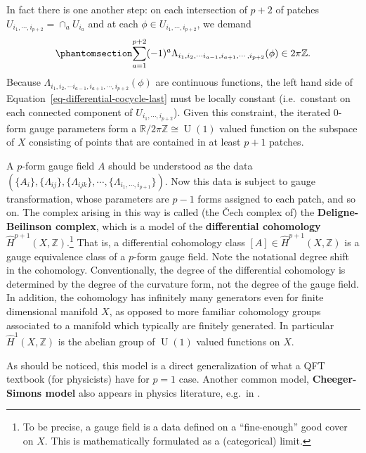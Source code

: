 \documentclass[
  letterpaper,
  DIV=11,
  numbers=noendperiod]{scrreport}
\DeclareMathOperator{\U}{U}
\begin{document}
In fact there is one another step: on each intersection of \(p+2\) of
patches \(U_{i_1,\cdots,i_{p+2}} = \cap_a U_{i_a}\) and at each
\(\phi\in U_{i_1,\cdots,i_{p+2}}\), we demand
\begin{equation}\phantomsection\label{eq-differential-cocycle-last}{ \sum_{a=1}^{p+2} (-1)^a \Lambda_{i_{1},i_2,\cdots i_{a-1},i_{a+1},\cdots,i_{p+2}}(\phi) \in 2\pi\mathbb{Z}.
}\end{equation} Because
\(\Lambda_{i_{1},i_2,\cdots i_{a-1},i_{a+1},\cdots,i_{p+2}}(\phi)\) are
continuous functions, the left hand side of
Equation~\ref{eq-differential-cocycle-last} must be locally constant
(i.e.~constant on each connected component of
\(U_{i_1,\cdots,i_{p+2}}\)). Given this constraint, the iterated 0-form
gauge parameters form a \(\mathbb{R}/2\pi\mathbb{Z}\cong\U(1)\) valued
function on the subspace of \(X\) consisting of points that are
contained in at least \(p+1\) patches.

A \(p\)-form gauge field \(A\) should be understood as the data
\((\{A_i\},\{\Lambda_{ij}\},\{\Lambda_{ijk}\},\cdots,\{\Lambda_{i_1,\cdots,i_{p+1}}\})\).
Now this data is subject to gauge transformation, whose parameters are
\(p-1\) forms assigned to each patch, and so on. The complex arising in
this way is called (the Čech complex of) the \textbf{Deligne-Beilinson
complex}, which is a model of the \textbf{differential cohomology}
\(\hat{H}^{p+1}(X,\mathbb{Z})\).\footnote{To be precise, a gauge field
  is a data defined on a ``fine-enough'' good cover on \(X\). This is
  mathematically formulated as a (categorical) limit.} That is, a
differential cohomology class \([A]\in\hat{H}^{p+1}(X,\mathbb{Z})\) is a
gauge equivalence class of a \(p\)-form gauge field. Note the notational
degree shift in the cohomology. Conventionally, the degree of the
differential cohomology is determined by the degree of the curvature
form, not the degree of the gauge field. In addition, the cohomology has
infinitely many generators even for finite dimensional manifold \(X\),
as opposed to more familiar cohomology groups associated to a manifold
which typically are finitely generated. In particular
\(\hat{H}^1(X,\mathbb{Z})\) is the abelian group of \(\U(1)\) valued
functions on \(X\).

As should be noticed, this model is a direct generalization of what a
QFT textbook (for physicists) have for \(p=1\) case. Another common
model, \textbf{Cheeger-Simons model} also appears in physics literature,
e.g.~in \autocite{Belov:2006jd,Hsieh:2020jpj}.
\end{document}
